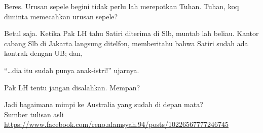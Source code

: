 Beres. Urusan sepele begini tidak perlu lah merepotkan Tuhan. Tuhan, koq diminta memecahkan urusan sepele?

Betul saja. Ketika Pak LH tahu Satiri diterima di Slb, muntab lah beliau. Kantor cabang Slb di Jakarta langsung ditelfon, memberitahu bahwa Satiri sudah ada kontrak dengan UB; dan,

“…dia itu sudah punya anak-istri!” ujarnya.

Pak LH tentu jangan disalahkan. Mempan?

Jadi bagaimana mimpi ke Australia yang sudah di depan mata?
\\[10pt]

Sumber tulisan asli \url{https://www.facebook.com/reno.alamsyah.94/posts/10226567777246745}

